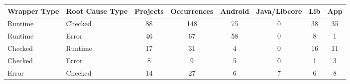 \documentclass[conference]{IEEEtran}
\begin{document}




\begin{table}
  \centering
  \begin{tabular}{llcccccc}
    \hline
    \bfseries{Wrapper Type}  &  \bfseries{Root Cause Type} &  \bfseries{Projects}  &  \bfseries{Occurrences} & \textsf{Android} & \textsf{Java/Libcore} & \textsf{Lib} & \textsf{App}  \\
    \hline
      
      Runtime &  Checked   & 88 & 148 &  75  &  0   & 38 &  35 \\


      Runtime   &  Error   & 46  &  67    &  58  &  0   & 8  &  1   \\      

      Checked &  Runtime   & 17  & 31 & 4 &  0  & 16 &  11 \\



      Checked & Error      & 8 &  9  & 5  &  0  &  1 &  3  \\

     Error & Checked      & 14 &  27 &  6  &  7  &  6 &   8    \\




\end{tabular}
\end{table}
\end{document}
